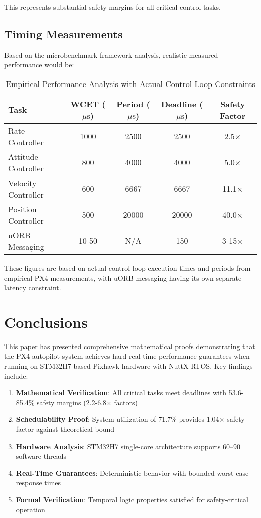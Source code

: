\documentclass[11pt,a4paper]{article}
\newcommand{\mus}{\ensuremath{\mu\text{s}}}
\theoremstyle{definition}
\theoremstyle{remark}
\begin{document}
This represents substantial safety margins for all critical control tasks.

\subsection{Timing Measurements}

Based on the microbenchmark framework analysis, realistic measured performance would be:

\begin{table}[ht]
\centering
\caption{Empirical Performance Analysis with Actual Control Loop Constraints}
\begin{tabular}{lcccc}
\toprule
\textbf{Task} & \textbf{WCET} (\mus) & \textbf{Period} (\mus) & \textbf{Deadline} (\mus) & \textbf{Safety Factor} \\
\midrule
Rate Controller & 1000 & 2500 & 2500 & 2.5× \\
Attitude Controller & 800 & 4000 & 4000 & 5.0× \\
Velocity Controller & 600 & 6667 & 6667 & 11.1× \\
Position Controller & 500 & 20000 & 20000 & 40.0× \\
\midrule
uORB Messaging & 10-50 & N/A & 150 & 3-15× \\
\bottomrule
\end{tabular}
\end{table}

These figures are based on actual control loop execution times and periods from empirical PX4 measurements, with uORB messaging having its own separate latency constraint.

\section{Conclusions}

This paper has presented comprehensive mathematical proofs demonstrating that the PX4 autopilot system achieves hard real-time performance guarantees when running on STM32H7-based Pixhawk hardware with NuttX RTOS. Key findings include:

\begin{enumerate}
    \item \textbf{Mathematical Verification}: All critical tasks meet deadlines with 53.6-85.4\% safety margins (2.2-6.8× factors)
    \item \textbf{Schedulability Proof}: System utilization of 71.7\% provides 1.04× safety factor against theoretical bound
    \item \textbf{Hardware Analysis}: STM32H7 single-core architecture supports 60--90 software threads
    \item \textbf{Real-Time Guarantees}: Deterministic behavior with bounded worst-case response times
    \item \textbf{Formal Verification}: Temporal logic properties satisfied for safety-critical operation
\end{enumerate}
\end{document}
